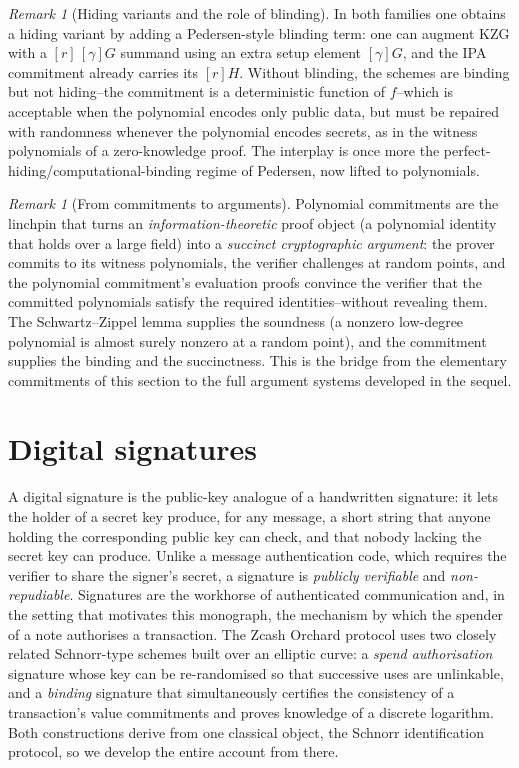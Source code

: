 \documentclass[11pt,a4paper]{article}
\theoremstyle{definition}
\theoremstyle{remark}
\newtheorem{remark}[theorem]{Remark}
\begin{document}
\begin{remark}[Hiding variants and the role of blinding]\label{commitments:rem:pcs-hiding}
In both families one obtains a hiding variant by adding a Pedersen-style blinding term: one can augment KZG with a \([r]\,[\gamma]G\) summand using an extra setup element \([\gamma]G\), and the IPA commitment already carries its \([r]H\). Without blinding, the schemes are binding but not hiding--the commitment is a deterministic function of \(f\)--which is acceptable when the polynomial encodes only public data, but must be repaired with randomness whenever the polynomial encodes secrets, as in the witness polynomials of a zero-knowledge proof. The interplay is once more the perfect-hiding/computational-binding regime of Pedersen, now lifted to polynomials.
\end{remark}

\begin{remark}[From commitments to arguments]\label{commitments:rem:outlook}
Polynomial commitments are the linchpin that turns an \emph{information-theoretic} proof object (a polynomial identity that holds over a large field) into a \emph{succinct cryptographic argument}: the prover commits to its witness polynomials, the verifier challenges at random points, and the polynomial commitment's evaluation proofs convince the verifier that the committed polynomials satisfy the required identities--without revealing them. The Schwartz--Zippel lemma supplies the soundness (a nonzero low-degree polynomial is almost surely nonzero at a random point), and the commitment supplies the binding and the succinctness. This is the bridge from the elementary commitments of this section to the full argument systems developed in the sequel.
\end{remark}

\clearpage

\section{Digital signatures}\label{sec:signatures}

A digital signature is the public-key analogue of a handwritten signature: it lets the holder of a secret key produce, for any message, a short string that anyone holding the corresponding public key can check, and that nobody lacking the secret key can produce. Unlike a message authentication code, which requires the verifier to share the signer's secret, a signature is \emph{publicly verifiable} and \emph{non-repudiable}. Signatures are the workhorse of authenticated communication and, in the setting that motivates this monograph, the mechanism by which the spender of a note authorises a transaction. The Zcash Orchard protocol uses two closely related Schnorr-type schemes built over an elliptic curve: a \emph{spend authorisation} signature whose key can be re-randomised so that successive uses are unlinkable, and a \emph{binding} signature that simultaneously certifies the consistency of a transaction's value commitments and proves knowledge of a discrete logarithm. Both constructions derive from one classical object, the Schnorr identification protocol, so we develop the entire account from there.
\end{document}
